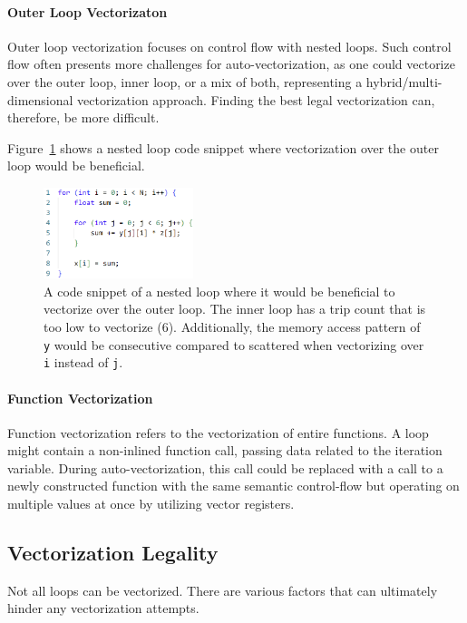 \documentclass[sigplan,11pt,nonacm]{acmart}
\begin{document}
\paragraph{Outer Loop Vectorizaton}
Outer loop vectorization focuses on control flow with nested loops. Such control flow often presents
more challenges for auto-vectorization, as one could vectorize over the outer loop,
inner loop, or a mix of both, representing a hybrid/multi-dimensional vectorization approach.
Finding the best legal vectorization can, therefore, be more difficult.

Figure~\ref{fig:outer-loop-vec} shows a nested loop code snippet where vectorization over the
outer loop would be beneficial.

\begin{figure}
  \centering
  \includegraphics[width=0.39\textwidth]{images/outer-loop-vec.png}
  \caption{A code snippet of a nested loop where it would be beneficial to vectorize over the 
  outer loop. The inner loop has a trip count that is too low to vectorize (6). Additionally,
  the memory access pattern of \texttt{y} would be consecutive compared to scattered when
  vectorizing over \texttt{i} instead of \texttt{j}.}
  \label{fig:outer-loop-vec}
\end{figure}

\paragraph{Function Vectorization}
Function vectorization refers to the vectorization of entire functions. A loop might contain a
non-inlined function call, passing data related to the iteration variable. During auto-vectorization, 
this call could be replaced with a call to a newly constructed function with the same semantic 
control-flow but operating on multiple values at once by utilizing vector registers.
 
\subsection{Vectorization Legality}
\label{sec:vec-legal}
Not all loops can be vectorized. There are various factors that can ultimately hinder any
vectorization attempts.
\end{document}
